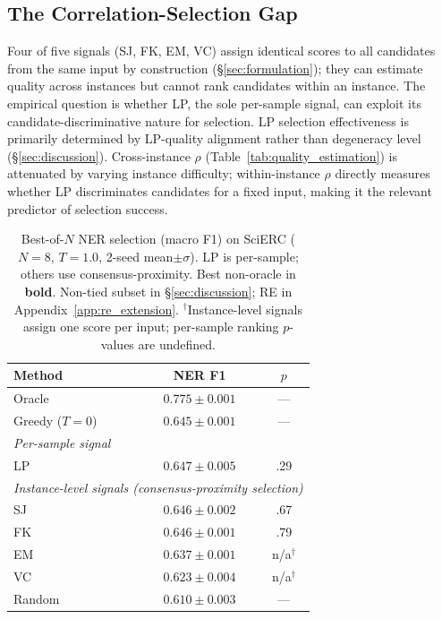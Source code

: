 \subsection{The Correlation-Selection Gap}
\label{sec:selection_gap}

Four of five signals (SJ, FK, EM, VC) assign identical scores to all candidates from the same input by construction (\S\ref{sec:formulation}); they can estimate quality across instances but cannot rank candidates within an instance.
The empirical question is whether LP, the sole per-sample signal, can exploit its candidate-discriminative nature for selection.
LP selection effectiveness is primarily determined by LP-quality alignment rather than degeneracy level (\S\ref{sec:discussion}).
Cross-instance $\rho$ (Table~\ref{tab:quality_estimation}) is attenuated by varying instance difficulty; within-instance $\rho$ directly measures whether LP discriminates candidates for a fixed input, making it the relevant predictor of selection success.

\begin{table}[t]
\centering
\small
\caption{Best-of-$N$ NER selection (macro F1) on SciERC ($N{=}8$, $T{=}1.0$, 2-seed mean${\pm}\sigma$). LP is per-sample; others use consensus-proximity. Best non-oracle in \textbf{bold}. Non-tied subset in \S\ref{sec:discussion}; RE in Appendix~\ref{app:re_extension}. $^\dagger$Instance-level signals assign one score per input; per-sample ranking $p$-values are undefined.}
\label{tab:selection}
\begin{tabular}{lcc}
\toprule
Method & NER F1 & $p$ \\
\midrule
Oracle & $0.775 \pm 0.001$ & --- \\
Greedy ($T{=}0$) & $0.645 \pm 0.001$ & --- \\
\midrule
\multicolumn{3}{l}{\textit{Per-sample signal}} \\
LP           & $\mathbf{0.647} \pm 0.005$ & .29 \\
\midrule
\multicolumn{3}{l}{\textit{Instance-level signals (consensus-proximity selection)}} \\
SJ           & $0.646 \pm 0.002$ & .67 \\
FK           & $0.646 \pm 0.001$ & .79 \\
EM           & $0.637 \pm 0.001$ & n/a$^\dagger$ \\
VC           & $0.623 \pm 0.004$ & n/a$^\dagger$ \\
\midrule
Random           & $0.610 \pm 0.003$ & --- \\
\bottomrule
\end{tabular}
\end{table}

